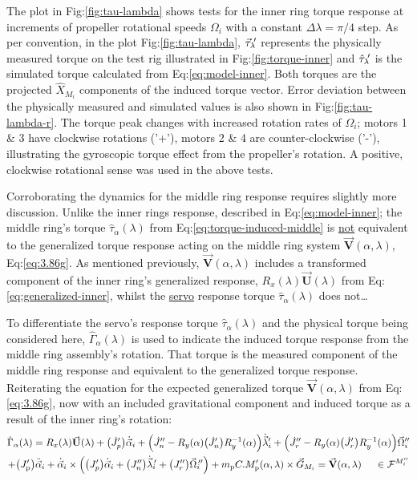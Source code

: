\par
The plot in Fig:\ref{fig:tau-lambda} shows tests for the inner ring torque response at increments of propeller rotational speeds $\Omega_i$ with a constant $\Delta\lambda=\pi/4$ step. As per convention, in the plot Fig:\ref{fig:tau-lambda}, $\vec{\tau}_\lambda\text{}\hspace{-2pt}'$ represents the physically measured torque on the test rig illustrated in Fig:\ref{fig:torque-inner} and $\hat{\tau}_\lambda\text{}\hspace{-2pt}'$ is the simulated torque calculated from Eq:\ref{eq:model-inner}. Both torques are the projected $\hat{X}_{M_i}$ components of the induced torque vector. Error deviation between the physically measured and simulated values is also shown in Fig:\ref{fig:tau-lambda-r}. The torque peak changes with increased rotation rates of $\Omega_i$; motors 1 \& 3 have clockwise rotations ('+'), motors 2 \& 4 are counter-clockwise ('-'), illustrating the gyroscopic torque effect from the propeller's rotation. A positive, clockwise rotational sense was used in the above tests. 
\par
Corroborating the dynamics for the middle ring response requires slightly more discussion. Unlike the inner rings response, described in Eq:\ref{eq:model-inner}; the middle ring's torque $\hat{\tau}_\alpha(\lambda)$ from Eq:\ref{eq:torque-induced-middle} is \underline{not} equivalent to the generalized torque response acting on the middle ring system $\vec{\mathbf{V}}(\alpha,\lambda)$, Eq:\ref{eq:3.86g}. As mentioned previously, $\vec{\mathbf{V}}(\alpha,\lambda)$ includes a transformed component of the inner ring's generalized response, $R_x(\lambda)\vec{\mathbf{U}}(\lambda)$ from Eq:\ref{eq:generalized-inner}, whilst the \underline{servo} response torque $\hat{\tau}_\alpha(\lambda)$ does not\ldots 
\par
To differentiate the servo's response torque $\hat{\tau}_\alpha(\lambda)$ and the physical torque being considered here, $\hat{\Gamma}_\alpha(\lambda)$ is used to indicate the induced torque response from the middle ring assembly's rotation. That torque is the measured component of the middle ring response and equivalent to the generalized torque response. Reiterating the equation for the expected generalized torque $\vec{\mathbf{V}}(\alpha,\lambda)$ from Eq:\ref{eq:3.86g}, now with an included gravitational component and induced torque as a result of the inner ring's rotation:
\begin{multline} \label{eq:model-middle}
\hat{\Gamma}_\alpha(\lambda)=R_x(\lambda)\vec{\mathbf{U}}(\lambda)+\big(\dot{J}_p'\big)\dot{\vec{\alpha}}_i+\Big(\dot{J}_n''-R_y(\alpha)\big(\dot{J}_n'\big)R_y^{-1}(\alpha)\Big)\dot{\vec{\lambda}}_i'+\Big(\dot{J}_r''-R_y(\alpha)\big(\dot{J}_r'\big)R_y^{-1}(\alpha)\Big)\vec{\Omega}_i''
\\
+\big(J_\text{p}'\big)\ddot{\vec{\alpha}}_i+\dot{\vec{\alpha}}_i\times \Big(\big(J_p'\big)\dot{\vec{\alpha}}_i+\big(J_n''\big)\dot{\vec{\lambda}}_i\hspace{-2pt}'+\big(J_r''\big)\vec{\Omega}_i\hspace{-2pt}''\Big)+m_\text{p}C.M'_{\text{p}}(\alpha,\lambda)\times\vec{G}_{M_i}=\vec{\mathbf{V}}(\alpha,\lambda)~~~~\in\mathcal{F}^{M_i''}
\end{multline}
